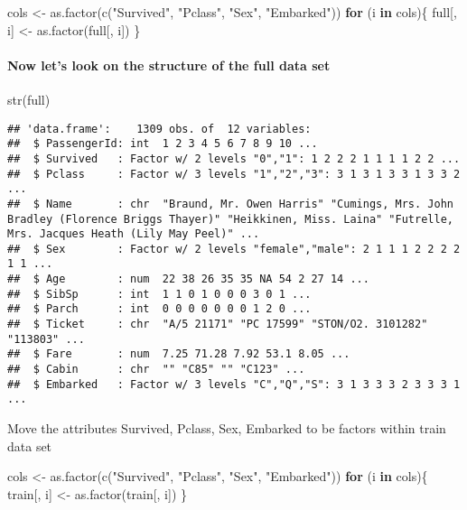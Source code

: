 \documentclass[
]{article}
\newenvironment{Shaded}{\begin{snugshade}}{\end{snugshade}}
\newcommand{\ControlFlowTok}[1]{\textcolor[rgb]{0.13,0.29,0.53}{\textbf{#1}}}
\newcommand{\FunctionTok}[1]{\textcolor[rgb]{0.00,0.00,0.00}{#1}}
\newcommand{\NormalTok}[1]{#1}
\newcommand{\OtherTok}[1]{\textcolor[rgb]{0.56,0.35,0.01}{#1}}
\newcommand{\StringTok}[1]{\textcolor[rgb]{0.31,0.60,0.02}{#1}}
\begin{document}
\begin{Shaded}
\begin{Highlighting}[]
\NormalTok{cols }\OtherTok{\textless{}{-}} \FunctionTok{as.factor}\NormalTok{(}\FunctionTok{c}\NormalTok{(}\StringTok{"Survived"}\NormalTok{, }\StringTok{"Pclass"}\NormalTok{, }\StringTok{"Sex"}\NormalTok{, }\StringTok{"Embarked"}\NormalTok{))}
\ControlFlowTok{for}\NormalTok{ (i }\ControlFlowTok{in}\NormalTok{ cols)\{}
\NormalTok{  full[, i] }\OtherTok{\textless{}{-}} \FunctionTok{as.factor}\NormalTok{(full[, i])}
\NormalTok{\}}
\end{Highlighting}
\end{Shaded}

\hypertarget{now-lets-look-on-the-structure-of-the-full-data-set}{%
\paragraph{Now let's look on the structure of the full data
set}\label{now-lets-look-on-the-structure-of-the-full-data-set}}

\begin{Shaded}
\begin{Highlighting}[]
\FunctionTok{str}\NormalTok{(full)}
\end{Highlighting}
\end{Shaded}

\begin{verbatim}
## 'data.frame':    1309 obs. of  12 variables:
##  $ PassengerId: int  1 2 3 4 5 6 7 8 9 10 ...
##  $ Survived   : Factor w/ 2 levels "0","1": 1 2 2 2 1 1 1 1 2 2 ...
##  $ Pclass     : Factor w/ 3 levels "1","2","3": 3 1 3 1 3 3 1 3 3 2 ...
##  $ Name       : chr  "Braund, Mr. Owen Harris" "Cumings, Mrs. John Bradley (Florence Briggs Thayer)" "Heikkinen, Miss. Laina" "Futrelle, Mrs. Jacques Heath (Lily May Peel)" ...
##  $ Sex        : Factor w/ 2 levels "female","male": 2 1 1 1 2 2 2 2 1 1 ...
##  $ Age        : num  22 38 26 35 35 NA 54 2 27 14 ...
##  $ SibSp      : int  1 1 0 1 0 0 0 3 0 1 ...
##  $ Parch      : int  0 0 0 0 0 0 0 1 2 0 ...
##  $ Ticket     : chr  "A/5 21171" "PC 17599" "STON/O2. 3101282" "113803" ...
##  $ Fare       : num  7.25 71.28 7.92 53.1 8.05 ...
##  $ Cabin      : chr  "" "C85" "" "C123" ...
##  $ Embarked   : Factor w/ 3 levels "C","Q","S": 3 1 3 3 3 2 3 3 3 1 ...
\end{verbatim}

Move the attributes Survived, Pclass, Sex, Embarked to be factors within
train data set

\begin{Shaded}
\begin{Highlighting}[]
\NormalTok{cols }\OtherTok{\textless{}{-}} \FunctionTok{as.factor}\NormalTok{(}\FunctionTok{c}\NormalTok{(}\StringTok{"Survived"}\NormalTok{, }\StringTok{"Pclass"}\NormalTok{, }\StringTok{"Sex"}\NormalTok{, }\StringTok{"Embarked"}\NormalTok{))}
\ControlFlowTok{for}\NormalTok{ (i }\ControlFlowTok{in}\NormalTok{ cols)\{}
\NormalTok{  train[, i] }\OtherTok{\textless{}{-}} \FunctionTok{as.factor}\NormalTok{(train[, i])}
\NormalTok{\}}
\end{Highlighting}
\end{Shaded}
\end{document}

